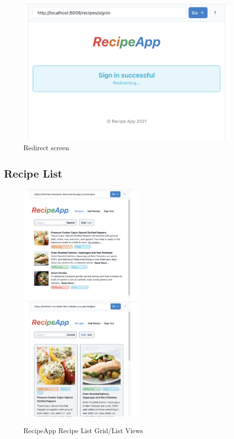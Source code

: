 \begin{figure}[htb]
  \centering
  \includegraphics[width=12.4cm]{thesis/paper/images/rec_redirect.png}
  \caption{Redirect screen}%
  \label{fig:rec_redirect}%
\end{figure}


\subsection{Recipe List}

\begin{figure}[htb]
  \centering
  \includegraphics[width=6.2cm]{thesis/paper/images/recipe_list.png}
  \,
  \includegraphics[width=6.2cm]{thesis/paper/images/recipe_grid.png}
  \caption{RecipeApp Recipe List Grid/List Views}%
  \label{fig:rec_recipe_list}%
\end{figure}

